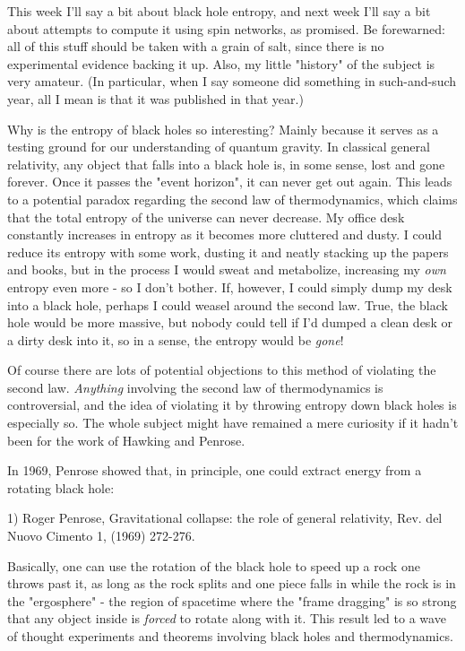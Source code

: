 

This week I'll say a bit about black hole entropy, and next week I'll
say a bit about attempts to compute it using spin networks, as promised.
Be forewarned: all of this stuff should be taken with a grain of salt,
since there is no experimental evidence backing it up.  Also, my little
"history" of the subject is very amateur.  (In particular, when I say
someone did something in such-and-such year, all I mean is that it was
published in that year.)

Why is the entropy of black holes so interesting?  Mainly because it
serves as a testing ground for our understanding of quantum gravity.  In
classical general relativity, any object that falls into a black hole
is, in some sense, lost and gone forever.  Once it passes the "event
horizon", it can never get out again.  This leads to a potential paradox
regarding the second law of thermodynamics, which claims that the total
entropy of the universe can never decrease.  My office desk constantly
increases in entropy as it becomes more cluttered and dusty.  I could
reduce its entropy with some work, dusting it and neatly stacking up the
papers and books, but in the process I would sweat and metabolize,
increasing my \emph{own} entropy even more - so I don't bother.  If,
however, I could simply dump my desk into a black hole, perhaps I could
weasel around the second law.  True, the black hole would be more
massive, but nobody could tell if I'd dumped a clean desk or a dirty
desk into it, so in a sense, the entropy would be \emph{gone}!

Of course there are lots of potential objections to this method of
violating the second law.   \emph{Anything} involving the second law of
thermodynamics is controversial, and the idea of violating it by
throwing entropy down black holes is especially so.  The whole subject
might have remained a mere curiosity if it hadn't been for the work of
Hawking and Penrose.

In 1969, Penrose showed that, in principle, one could extract energy 
from a rotating black hole:

1) Roger Penrose, Gravitational collapse: the role of general
relativity, Rev. del Nuovo Cimento 1, (1969) 272-276.

Basically, one can use the rotation of the black hole to speed
up a rock one throws past it, as long as the rock splits and one 
piece falls in while the rock is in the "ergosphere" - the region 
of spacetime where the "frame dragging" is so strong that any object
inside is \emph{forced} to rotate along with it.   This result led to a
wave of thought experiments and theorems involving black holes and
thermodynamics.

